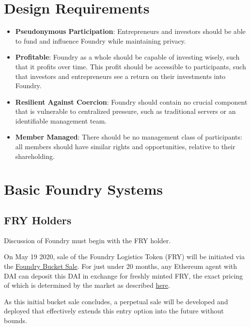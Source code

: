 \documentclass{article}
\begin{document}
\section{Design Requirements} \label{design-requirements}

\begin{itemize}

\item \textbf{Pseudonymous Participation}: Entrepreneurs and investors should be able to fund and influence Foundry while maintaining privacy.

\item \textbf{Profitable}: Foundry as a whole should be capable of investing wisely, such that it profits over time. This profit should be accessible to participants, such that investors and entrepreneurs see a return on their investments into Foundry.

\item \textbf{Resilient Against Coercion}: Foundry should contain no crucial component that is vulnerable to centralized pressure, such as traditional servers or an identifiable management team.

\item \textbf{Member Managed}: There should be no management class of participants: all members should have similar rights and opportunities, relative to their shareholding.

\end{itemize}

\section{Basic Foundry Systems} \label{basic}

\subsection{FRY Holders} \label{fry-holders}

Discussion of Foundry must begin with the FRY holder.

On May 19 2020, sale of the Foundry Logistics Token (FRY) will be initiated via the \href{https://foundrydao.com/faq/#about-the-token-sale}{Foundry Bucket Sale}. For just under 20 months, any Ethereum agent with DAI can deposit this DAI in exchange for freshly minted FRY, the exact pricing of which is determined by the market as described \href{https://foundrydao.com/faq/#how-much-is-the-sale-looking-to-raise}{here}.

As this initial bucket sale concludes, a perpetual sale will be developed and deployed that effectively extends this entry option into the future without bounds.
\end{document}
